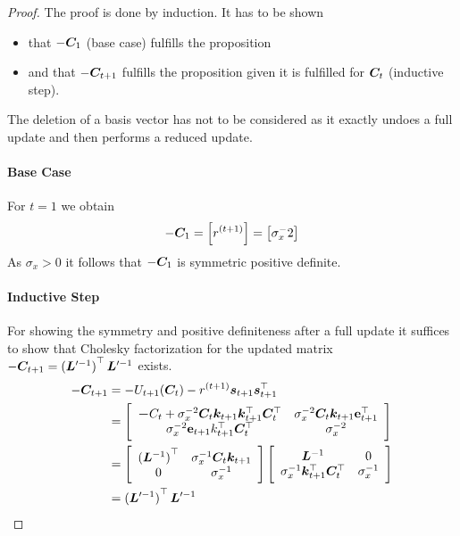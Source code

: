 \begin{proof}
    The proof is done by induction. It has to be shown
    \begin{itemize}
        \item that $-\bm{C}_1$ (base case) fulfills the proposition
        \item and that $-\bm{C}_{t+1}$ fulfills the proposition given it is 
            fulfilled for $\bm{C}_t$ (inductive step).
    \end{itemize}
    The deletion of a basis vector has not to be considered as it exactly undoes 
    a full update and then performs a reduced update.

    \paragraph{Base Case}
    For $t = 1$ we obtain
    \begin{equation*}
        -\mat C_1 = \sbr{r^{(t+1)}} = \sbr{\sigma_x^-2}
    \end{equation*}
    As $\sigma_x > 0$ it follows that $-\bm{C}_1$ is symmetric positive 
    definite.

    \paragraph{Inductive Step}
    For showing the symmetry and positive definiteness after a full update it 
    suffices to show that Cholesky factorization for the updated matrix $-\mat 
    C_{t+1} = \del[0]{\mat L'^{-1}}\Tr \mat L'^{-1}$ exists.
\begin{align*}
        -\mat C_{t+1} &= -U_{t+1}(\mat C_t) - r^{(t+1)} \vc s_{t+1} \vc 
        s_{t+1}\Tr \\
        &= \sbr{\begin{array}{cc}
                \mat -C_t + \sigma_x^{-2} \mat C_t \vc k_{t+1} \vc k_{t+1}\Tr 
                \mat C_t\Tr & \sigma_x^{-2} \mat C_t \vc k_{t+1} \vc\e_{t+1}\Tr 
                \\
                \sigma_x^{-2} \vc\e_{t+1} k_{t+1}\Tr \mat C_t\Tr & \sigma_x^{-2}
            \end{array}} \\
        &= \sbr{\begin{array}{cc}
                \del[0]{\mat L^{-1}}\Tr & \sigma_x^{-1} \mat C_t \vc k_{t+1} \\
                0 & \sigma_x^{-1}
            \end{array}} \sbr{\begin{array}{cc}
                \mat L^{-1} & 0 \\
                \sigma_x^{-1} \vc k_{t+1}\Tr \mat C_t\Tr & \sigma_x^{-1}
            \end{array}} \\
        &= \del[0]{\mat L'^{-1}}\Tr \mat L'^{-1}
    \end{align*}


\end{proof}
